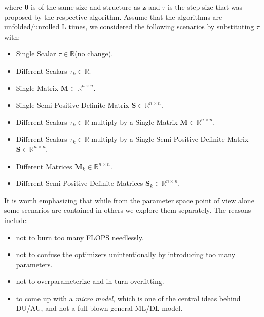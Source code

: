 \noindent where $\boldsymbol{\theta}$ is of the same size and structure as $\boldsymbol{z}$ and $\tau$ is the step size that was 
proposed by the respective algorithm. Assume that the algorithms are unfolded/unrolled $\mathrm{L}$ times, we considered the following 
scenarios by substituting $\tau$ with:

\begin{itemize}
  \item Single Scalar $\tau \in \mathbb{R}$(no change).
  \item Different Scalars $\tau_k\in\mathbb{R}$.
  \item Single Matrix $\boldsymbol{M}\in \mathbb{R}^{n\times n}$.
  \item Single Semi-Positive Definite Matrix $\boldsymbol{S}\in \mathbb{R}^{n\times n}$.
  \item Different Scalars $\tau_k \in \mathbb{R}$ multiply by a Single Matrix $\boldsymbol{M} \in \mathbb{R}^{n\times n}$.
  \item Different Scalars $\tau_k \in \mathbb{R}$ multiply by a Single Semi-Positive Definite Matrix $\boldsymbol{S} \in \mathbb{R}^{n\times n}$.
  \item Different Matrices $\boldsymbol{M}_k\in \mathbb{R}^{n\times n}$.
  \item Different Semi-Positive Definite Matrices $\boldsymbol{S}_k\in \mathbb{R}^{n\times n}$.
\end{itemize}

\noindent It is worth emphasizing that while from the parameter space point of view alone some scenarios are contained in others we explore them separately. 
The reasons include:
\begin{itemize}
  \item not to burn too many \ac{FLOPS}\cite{Hager2010}\cite{Hennessy2019} needlessly.
  \item not to confuse the optimizers unintentionally by introducing too many parameters\cite{Sun2019}.
  \item not to overparameterize and in turn overfitting\cite{Bishop2006}\cite{Goodfellow2016}\cite{ShalevShwartz2014}.
  \item to come up with a \emph{micro model}, which is one of the central ideas behind \ac{DU}/\ac{AU}\cite{Shechtman2015}, and not a full blown general \ac{ML}/\ac{DL} model.
\end{itemize}


